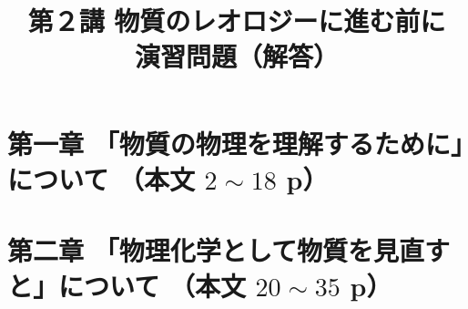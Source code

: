 \documentclass[uplatex,dvipdfmx,a4paper,11pt]{jsreport}
\title{第２講 物質のレオロジーに進む前に\\演習問題（解答）}
\author{}
\date{}
\begin{document}
\maketitle

\section*{第一章 「物質の物理を理解するために」について （本文 $2\sim18$ p）}

\clearpage

\clearpage
\section*{第二章 「物理化学として物質を見直すと」について （本文 $20\sim35$ p）}

\clearpage
\end{document}
